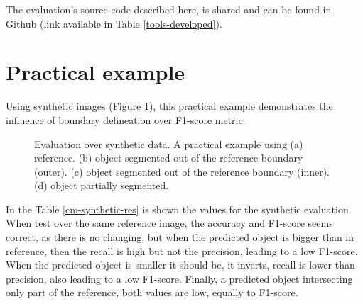 The evaluation's source-code described here, is shared and can be found in Github (link available in Table \ref{tools-developed}).

\section{Practical example}
Using synthetic images (Figure \ref{cm-synthetic}), this practical example demonstrates the influence of boundary delineation over F1-score metric.
\begin{figure}[H]
    \centering    
    \caption{Evaluation over synthetic data. A practical example using (a) reference. (b) object segmented out of the reference boundary (outer). (c) object segmented out of the reference boundary (inner). (d) object partially segmented.}
    \vspace{6mm}
	\legenda{}
    \label{cm-synthetic}
\end{figure}

In the Table \ref{cm-synthetic-res} is shown the values for the synthetic evaluation. When test over the same reference image, the accuracy and F1-score seems correct, as there is no changing, but when the predicted object is bigger than in reference, then the recall is high but not the precision, leading to a low F1-score. When the predicted object is smaller it should be, it inverts, recall is lower than precision, also leading to a low F1-score. Finally, a predicted object intersecting only part of the reference, both values are low, equally to F1-score.

